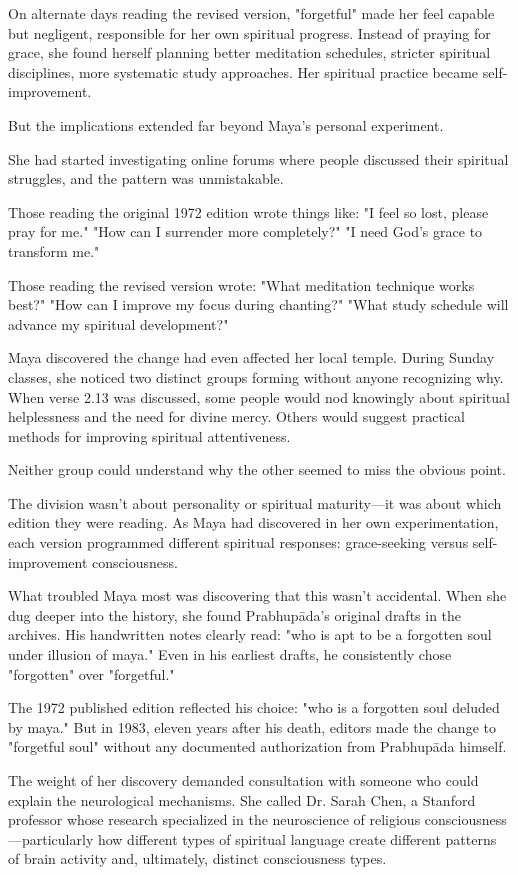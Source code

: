 \documentclass[12pt,twoside]{book}
\begin{document}
On alternate days reading the revised version, "forgetful" made her feel capable but negligent, responsible for her own spiritual progress. Instead of praying for grace, she found herself planning better meditation schedules, stricter spiritual disciplines, more systematic study approaches. Her spiritual practice became self-improvement.

But the implications extended far beyond Maya's personal experiment.

She had started investigating online forums where people discussed their spiritual struggles, and the pattern was unmistakable.

Those reading the original 1972 edition wrote things like: "I feel so lost, please pray for me." "How can I surrender more completely?" "I need God's grace to transform me."

Those reading the revised version wrote: "What meditation technique works best?" "How can I improve my focus during chanting?" "What study schedule will advance my spiritual development?"

Maya discovered the change had even affected her local temple. During Sunday classes, she noticed two distinct groups forming without anyone recognizing why. When verse 2.13 was discussed, some people would nod knowingly about spiritual helplessness and the need for divine mercy. Others would suggest practical methods for improving spiritual attentiveness.

Neither group could understand why the other seemed to miss the obvious point.

The division wasn't about personality or spiritual maturity—it was about which edition they were reading. As Maya had discovered in her own experimentation, each version programmed different spiritual responses: grace-seeking versus self-improvement consciousness.

What troubled Maya most was discovering that this wasn't accidental. When she dug deeper into the history, she found Prabhupāda's original drafts in the archives. His handwritten notes clearly read: "who is apt to be a forgotten soul under illusion of maya." Even in his earliest drafts, he consistently chose "forgotten" over "forgetful."

The 1972 published edition reflected his choice: "who is a forgotten soul deluded by maya." But in 1983, eleven years after his death, editors made the change to "forgetful soul" without any documented authorization from Prabhupāda himself.

The weight of her discovery demanded consultation with someone who could explain the neurological mechanisms. She called Dr. Sarah Chen, a Stanford professor whose research specialized in the neuroscience of religious consciousness—particularly how different types of spiritual language create different patterns of brain activity and, ultimately, distinct consciousness types.
\end{document}
